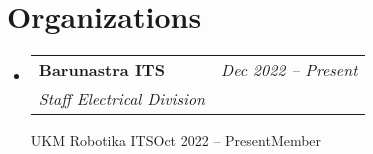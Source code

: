 \documentclass[letterpaper,11pt]{article}
\makeatletter
\newcommand{\resumeOrganizationHeading}[4]{
  \vspace{-2pt}\item
    \begin{tabular*}{0.97\textwidth}[t]{l@{\extracolsep{\fill}}r}
      \textbf{#1} & \textit{\small #2} \\
      \textit{\small#3}
    \end{tabular*}\vspace{-7pt}
}
\newcommand{\resumeSubHeadingListStart}{\begin{itemize}[leftmargin=0.15in, label={}]}
\newcommand{\resumeSubHeadingListEnd}{\end{itemize}}
\makeatother
\begin{document}

\section{Organizations}
  \resumeSubHeadingListStart

    \resumeOrganizationHeading
      {Barunastra ITS}{Dec 2022 -- Present}{Staff Electrical Division}

    \resumeOrganizationHeading
      {UKM Robotika ITS}{Oct 2022 -- Present}{Member}

  \resumeSubHeadingListEnd











\end{document}
